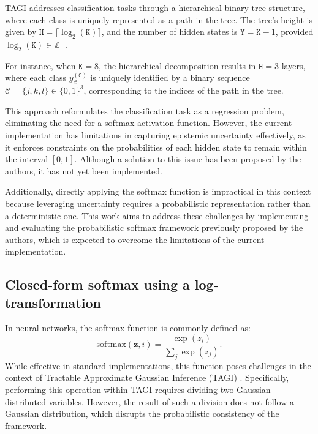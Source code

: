 \documentclass{article}
\begin{document}
TAGI addresses classification tasks through a hierarchical binary tree structure, where each class is uniquely represented as a path in the tree. The tree’s height is given by $\mathtt{H} = \lceil \log_2(\mathtt{K}) \rceil$, and the number of hidden states is $\mathtt{Y} = \mathtt{K} - 1$, provided $\log_2(\mathtt{K}) \in \mathbb{Z}^+$.

For instance, when $\mathtt{K} = 8$, the hierarchical decomposition results in $\mathtt{H} = 3$ layers, where each class $y_{\mathcal{C}}^{(\mathtt{C})}$ is uniquely identified by a binary sequence $\mathcal{C} = \{j, k, l\} \in \{0, 1\}^3$, corresponding to the indices of the path in the tree.

This approach reformulates the classification task as a regression problem, eliminating the need for a softmax activation function. However, the current implementation has limitations in capturing epistemic uncertainty effectively, as it enforces constraints on the probabilities of each hidden state to remain within the interval $[0,1]$. Although a solution to this issue has been proposed by the authors, it has not yet been implemented.

Additionally, directly applying the softmax function is impractical in this context because leveraging uncertainty requires a probabilistic representation rather than a deterministic one. This work aims to address these challenges by implementing and evaluating the probabilistic softmax framework previously proposed by the authors, which is expected to overcome the limitations of the current implementation.

\subsection{Closed-form softmax using a log-transformation}

In neural networks, the softmax function is commonly defined as:
\begin{equation}
\text{softmax}(\bm{z},i) = \frac{\exp(z_i)}{\sum_j \exp(z_j)}.
\end{equation}
While effective in standard implementations, this function poses challenges in the context of Tractable Approximate Gaussian Inference (TAGI) \cite{goulet2020tractable}. Specifically, performing this operation within TAGI requires dividing two Gaussian-distributed variables. However, the result of such a division does not follow a Gaussian distribution, which disrupts the probabilistic consistency of the framework.
\end{document}
